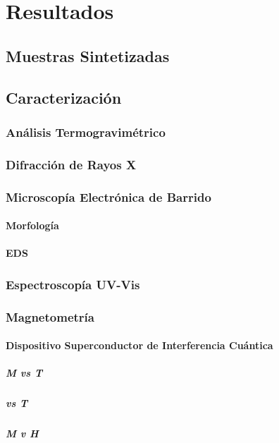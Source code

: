 \documentclass[../main.tex]{subfiles}
\begin{document}
\chapter{Resultados}

\section{Muestras Sintetizadas}

\section{Caracterización}

\subsection{Análisis Termogravimétrico}

\subsection{Difracción de Rayos X}

\subsection{Microscopía Electrónica de Barrido}

\subsubsection{Morfología}

\subsubsection{EDS}

\subsection{Espectroscopía UV-Vis}

\subsection{Magnetometría}

\subsubsection{Dispositivo Superconductor de Interferencia Cuántica}

\paragraph{M vs T}

\paragraph{\textXi{} vs T}

\paragraph{M v H}
\end{document}
